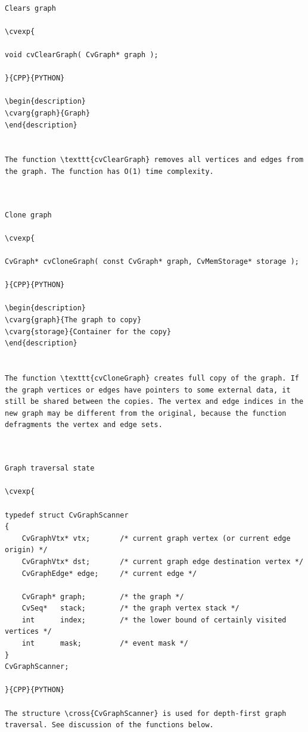 \label{ClearGraph}
\begin{verbatim}

Clears graph

\cvexp{

void cvClearGraph( CvGraph* graph );

}{CPP}{PYTHON}

\begin{description}
\cvarg{graph}{Graph}
\end{description}


The function \texttt{cvClearGraph} removes all vertices and edges from the graph. The function has O(1) time complexity.


\end{verbatim}
\label{CloneGraph}
\begin{verbatim}

Clone graph

\cvexp{

CvGraph* cvCloneGraph( const CvGraph* graph, CvMemStorage* storage );

}{CPP}{PYTHON}

\begin{description}
\cvarg{graph}{The graph to copy}
\cvarg{storage}{Container for the copy}
\end{description}


The function \texttt{cvCloneGraph} creates full copy of the graph. If the graph vertices or edges have pointers to some external data, it still be shared between the copies. The vertex and edge indices in the new graph may be different from the original, because the function defragments the vertex and edge sets.


\end{verbatim}
\label{CvGraphScanner}
\begin{verbatim}

Graph traversal state

\cvexp{

typedef struct CvGraphScanner
{
    CvGraphVtx* vtx;       /* current graph vertex (or current edge origin) */
    CvGraphVtx* dst;       /* current graph edge destination vertex */
    CvGraphEdge* edge;     /* current edge */

    CvGraph* graph;        /* the graph */
    CvSeq*   stack;        /* the graph vertex stack */
    int      index;        /* the lower bound of certainly visited vertices */
    int      mask;         /* event mask */
}
CvGraphScanner;

}{CPP}{PYTHON}

The structure \cross{CvGraphScanner} is used for depth-first graph traversal. See discussion of the functions below.


\end{verbatim}
